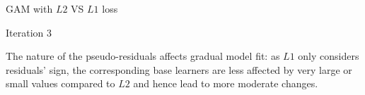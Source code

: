 \begin{frame}{GAM with $L2$ VS $L1$ loss}
{\vfill

Iteration 3
}


\vfill

\footnotesize

The nature of the pseudo-residuals affects gradual model fit: as $L1$ only 
considers residuals' sign, the corresponding base learners are less affected by very large or small values
compared to $L2$ and hence lead to more moderate changes.%

\end{frame}


